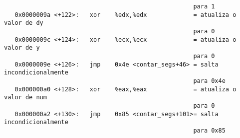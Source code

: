 \documentclass[a4paper, 12pt, portuguese]{article}
\begin{document}
\begin{verbatim}
                                                     para 1
   0x0000009a <+122>:	xor    %edx,%edx             = atualiza o valor de dy
                                                     para 0
   0x0000009c <+124>:	xor    %ecx,%ecx             = atualiza o valor de y
                                                     para 0
   0x0000009e <+126>:	jmp    0x4e <contar_segs+46> = salta incondicionalmente
                                                     para 0x4e
   0x000000a0 <+128>:	xor    %eax,%eax             = atualiza o valor de num
                                                     para 0
   0x000000a2 <+130>:	jmp    0x85 <contar_segs+101>= salta incondicionalmente
                                                     para 0x85

\end{verbatim}
\end{document}
